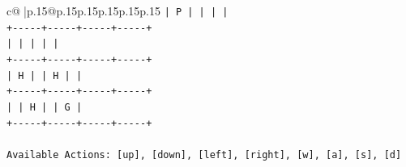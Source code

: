 \documentclass{article}
\begin{document}
{\begin{supertabular}{c@{$\;$}|p{.15\linewidth}@{}p{.15\linewidth}p{.15\linewidth}p{.15\linewidth}p{.15\linewidth}p{.15\linewidth}}
{{{\texttt{|  P  |     |     |     |} \\
\texttt{+{-}{-}{-}{-}{-}+{-}{-}{-}{-}{-}+{-}{-}{-}{-}{-}+{-}{-}{-}{-}{-}+} \\
\texttt{|     |     |     |     |} \\
\texttt{+{-}{-}{-}{-}{-}+{-}{-}{-}{-}{-}+{-}{-}{-}{-}{-}+{-}{-}{-}{-}{-}+} \\
\texttt{|  H  |     |  H  |     |} \\
\texttt{+{-}{-}{-}{-}{-}+{-}{-}{-}{-}{-}+{-}{-}{-}{-}{-}+{-}{-}{-}{-}{-}+} \\
\texttt{|     |  H  |     |  G  |} \\
\texttt{+{-}{-}{-}{-}{-}+{-}{-}{-}{-}{-}+{-}{-}{-}{-}{-}+{-}{-}{-}{-}{-}+} \\
\\ 
\texttt{Available Actions: {[}up{]}, {[}down{]}, {[}left{]}, {[}right{]}, {[}w{]}, {[}a{]}, {[}s{]}, {[}d{]}} \\
            }
        }
    }
     \\ \\


\end{supertabular}}
\end{document}
